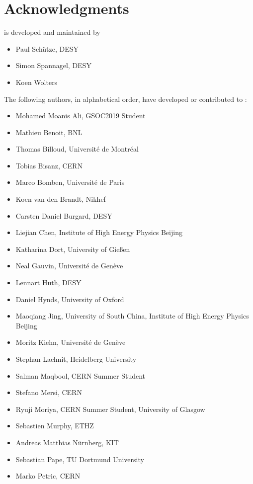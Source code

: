 \chapter{Acknowledgments}

\apsq is developed and maintained by

\begin{itemize}
    \item Paul Schütze, DESY
    \item Simon Spannagel, DESY
    \item Koen Wolters
\end{itemize}

The following authors, in alphabetical order, have developed or contributed to \apsq:

\begin{itemize}
\item Mohamed Moanis Ali, GSOC2019 Student
\item Mathieu Benoit, BNL
\item Thomas Billoud, Université de Montréal
\item Tobias Bisanz, CERN
\item Marco Bomben, Université de Paris
\item Koen van den Brandt, Nikhef
\item Carsten Daniel Burgard, DESY
\item Liejian Chen, Institute of High Energy Physics Beijing
\item Katharina Dort, University of Gie\ss en
\item Neal Gauvin, Université de Genève
\item Lennart Huth, DESY
\item Daniel Hynds, University of Oxford
\item Maoqiang Jing, University of South China, Institute of High Energy Physics Beijing
\item Moritz Kiehn, Université de Genève
\item Stephan Lachnit, Heidelberg University
\item Salman Maqbool, CERN Summer Student
\item Stefano Mersi, CERN
\item Ryuji Moriya, CERN Summer Student, University of Glasgow
\item Sebastien Murphy, ETHZ
\item Andreas Matthias Nürnberg, KIT
\item Sebastian Pape, TU Dortmund University
\item Marko Petric, CERN

\end{itemize}

